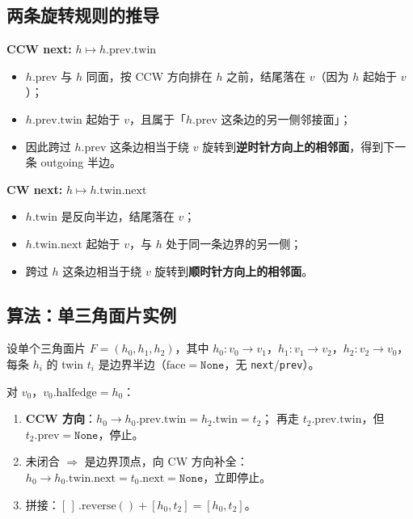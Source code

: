 \documentclass[11pt,a4paper]{article}
\begin{document}
\subsection{两条旋转规则的推导}

\textbf{CCW next:} $h \mapsto h.\mathrm{prev}.\mathrm{twin}$

\begin{itemize}
  \item $h.\mathrm{prev}$ 与 $h$ 同面，按 CCW 方向排在 $h$ 之前，结尾落在 $v$（因为 $h$ 起始于 $v$）；
  \item $h.\mathrm{prev}.\mathrm{twin}$ 起始于 $v$，且属于「$h.\mathrm{prev}$ 这条边的另一侧邻接面」；
  \item 因此跨过 $h.\mathrm{prev}$ 这条边相当于绕 $v$ 旋转到\textbf{逆时针方向上的相邻面}，得到下一条 outgoing 半边。
\end{itemize}

\textbf{CW next:} $h \mapsto h.\mathrm{twin}.\mathrm{next}$

\begin{itemize}
  \item $h.\mathrm{twin}$ 是反向半边，结尾落在 $v$；
  \item $h.\mathrm{twin}.\mathrm{next}$ 起始于 $v$，与 $h$ 处于同一条边界的另一侧；
  \item 跨过 $h$ 这条边相当于绕 $v$ 旋转到\textbf{顺时针方向上的相邻面}。
\end{itemize}

\subsection{算法：单三角面片实例}

设单个三角面片 $F=(h_0, h_1, h_2)$，其中 $h_0:v_0\to v_1$，$h_1:v_1\to v_2$，$h_2:v_2\to v_0$，
每条 $h_i$ 的 twin $t_i$ 是边界半边（$\mathrm{face}=\texttt{None}$，无 \texttt{next}/\texttt{prev}）。

对 $v_0$，$v_0.\mathrm{halfedge}=h_0$：

\begin{enumerate}
  \item \textbf{CCW 方向}：$h_0 \to h_0.\mathrm{prev}.\mathrm{twin} = h_2.\mathrm{twin} = t_2$；
        再走 $t_2.\mathrm{prev}.\mathrm{twin}$，但 $t_2.\mathrm{prev}=\texttt{None}$，停止。
  \item 未闭合 $\Rightarrow$ 是边界顶点，向 CW 方向补全：
        $h_0 \to h_0.\mathrm{twin}.\mathrm{next} = t_0.\mathrm{next}=\texttt{None}$，立即停止。
  \item 拼接：$[\,]\,.\mathrm{reverse}() + [h_0, t_2] = [h_0, t_2]$。
\end{enumerate}
\end{document}
